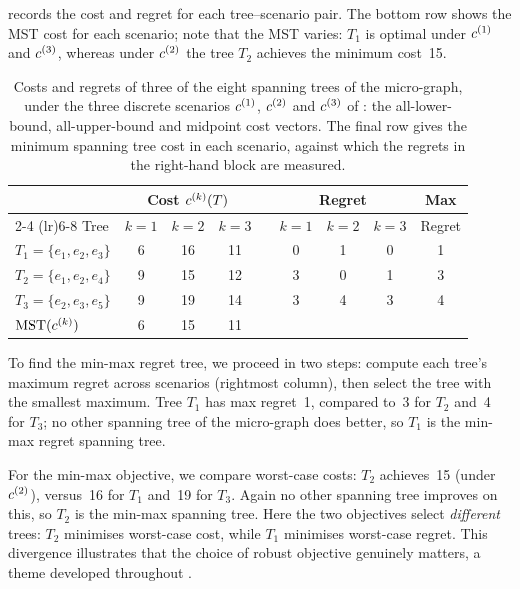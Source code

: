  records the cost and regret for each tree--scenario pair.
The bottom row shows the MST cost for each scenario; note that the MST varies: $T_1$ is optimal under $c^{(1)}$ and $c^{(3)}$, whereas under $c^{(2)}$ the tree $T_2$ achieves the minimum cost~15.

\begin{table}[htbp]
\centering
\caption{Costs and regrets of three of the eight spanning trees of the micro-graph, under the three discrete scenarios $c^{(1)}$, $c^{(2)}$ and $c^{(3)}$ of : the all-lower-bound, all-upper-bound and midpoint cost vectors. The final row gives the minimum spanning tree cost in each scenario, against which the regrets in the right-hand block are measured.}
\label{tab:micro-graph-costs}
\begin{tabular}{l ccc c ccc c}
\toprule
& \multicolumn{3}{c}{Cost $c^{(k)}(T)$} & & \multicolumn{3}{c}{Regret} & Max \\
\cmidrule(lr){2-4} \cmidrule(lr){6-8}
Tree & $k{=}1$ & $k{=}2$ & $k{=}3$ & & $k{=}1$ & $k{=}2$ & $k{=}3$ & Regret \\
\midrule
$T_1 = \{e_1, e_2, e_3\}$ & 6 & 16 & 11 & & 0 & 1 & 0 & 1 \\
$T_2 = \{e_1, e_2, e_4\}$ & 9 & 15 & 12 & & 3 & 0 & 1 & 3 \\
$T_3 = \{e_2, e_3, e_5\}$ & 9 & 19 & 14 & & 3 & 4 & 3 & 4 \\
\midrule
$\mathrm{MST}(c^{(k)})$ & 6 & 15 & 11 \\
\bottomrule
\end{tabular}
\end{table}

To find the min-max regret tree, we proceed in two steps: compute each tree's maximum regret across scenarios (rightmost column), then select the tree with the smallest maximum.
Tree $T_1$ has max regret~1, compared to~3 for $T_2$ and~4 for $T_3$; no other spanning tree of the micro-graph does better, so $T_1$ is the min-max regret spanning tree.

For the min-max objective, we compare worst-case costs: $T_2$ achieves~15 (under $c^{(2)}$), versus~16 for $T_1$ and~19 for $T_3$.
Again no other spanning tree improves on this, so $T_2$ is the min-max spanning tree.
Here the two objectives select \emph{different} trees: $T_2$ minimises worst-case cost, while $T_1$ minimises worst-case regret.
This divergence illustrates that the choice of robust objective genuinely matters, a theme developed throughout .

